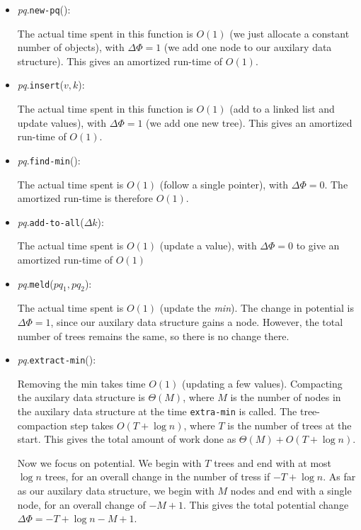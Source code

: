 \documentclass[12pt]{exam}
\newcommand*{\bigtheta}[1]{\Theta\left( #1 \right)}
\newcommand*{\bigo}[1]{O \left( #1 \right)}
\begin{document}
\begin{questions}
\begin{solution}
\begin{itemize}
  \item \textit{pq}.\texttt{new-pq}():

    The actual time spent in this function is $\bigo{1}$ (we just allocate a constant number of objects), with $\Delta \Phi = 1$ (we add one node to our auxilary data structure). This gives an amortized run-time of $\bigo{1}$.

  \item \textit{pq}.\texttt{insert}($v,k$):

    The actual time spent in this function is $\bigo{1}$ (add to a linked list and update values), with $\Delta \Phi = 1$ (we add one new tree). This gives an amortized run-time of $\bigo{1}$.

  \item \textit{pq}.\texttt{find-min}():

    The actual time spent is $\bigo{1}$ (follow a single pointer), with $\Delta \Phi = 0$. The amortized run-time is therefore $\bigo{1}$.

  \item \textit{pq}.\texttt{add-to-all}($\Delta k$):

    The actual time spent is $\bigo{1}$ (update a value), with $\Delta \Phi = 0$ to give an amortized run-time of $\bigo{1}$

  \item \textit{pq}.\texttt{meld}($pq_1, pq_2$):

    The actual time spent is $\bigo{1}$ (update the \textit{min}). The change in potential is $\Delta \Phi = 1$, since our auxilary data structure gains a node. However, the total number of trees remains the same, so there is no change there.

  \item \textit{pq}.\texttt{extract-min}():

    Removing the min takes time $\bigo{1}$ (updating a few values). Compacting the auxilary data structure is $\bigtheta{M}$, where $M$ is the number of nodes in the auxilary data structure at the time \texttt{extra-min} is called. The tree-compaction step takes $\bigo{T + \log n}$, where $T$ is the number of trees at the start. This gives the total amount of work done as $\bigtheta{M} + \bigo{T + \log n}$.

    Now we focus on potential. We begin with $T$ trees and end with at most $\log n$ trees, for an overall change in the number of tress if $-T + \log n$. As far as our auxilary data structure, we begin with $M$ nodes and end with a single node, for an overall change of $-M + 1$. This gives the total potential change $\Delta \Phi = -T + \log n - M + 1$. 


\end{itemize}
\end{solution}
\end{questions}
\end{document}

